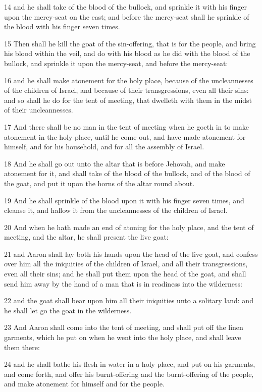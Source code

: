 \par 14 and he shall take of the blood of the bullock, and sprinkle it with his finger upon the mercy-seat on the east; and before the mercy-seat shall he sprinkle of the blood with his finger seven times.
\par 15 Then shall he kill the goat of the sin-offering, that is for the people, and bring his blood within the veil, and do with his blood as he did with the blood of the bullock, and sprinkle it upon the mercy-seat, and before the mercy-seat:
\par 16 and he shall make atonement for the holy place, because of the uncleannesses of the children of Israel, and because of their transgressions, even all their sins: and so shall he do for the tent of meeting, that dwelleth with them in the midst of their uncleannesses.
\par 17 And there shall be no man in the tent of meeting when he goeth in to make atonement in the holy place, until he come out, and have made atonement for himself, and for his household, and for all the assembly of Israel.
\par 18 And he shall go out unto the altar that is before Jehovah, and make atonement for it, and shall take of the blood of the bullock, and of the blood of the goat, and put it upon the horns of the altar round about.
\par 19 And he shall sprinkle of the blood upon it with his finger seven times, and cleanse it, and hallow it from the uncleannesses of the children of Israel.
\par 20 And when he hath made an end of atoning for the holy place, and the tent of meeting, and the altar, he shall present the live goat:
\par 21 and Aaron shall lay both his hands upon the head of the live goat, and confess over him all the iniquities of the children of Israel, and all their transgressions, even all their sins; and he shall put them upon the head of the goat, and shall send him away by the hand of a man that is in readiness into the wilderness:
\par 22 and the goat shall bear upon him all their iniquities unto a solitary land: and he shall let go the goat in the wilderness.
\par 23 And Aaron shall come into the tent of meeting, and shall put off the linen garments, which he put on when he went into the holy place, and shall leave them there:
\par 24 and he shall bathe his flesh in water in a holy place, and put on his garments, and come forth, and offer his burnt-offering and the burnt-offering of the people, and make atonement for himself and for the people.
